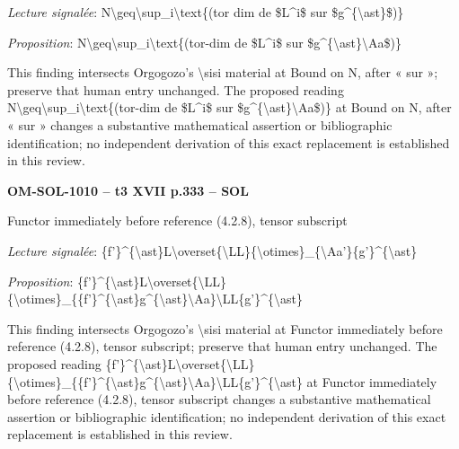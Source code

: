 \emph{Lecture signalée}: N\textbackslash{}geq\textbackslash{}sup\_i\textbackslash{}text\{(tor dim de \$L\textasciicircum{}i\$ sur \$g\textasciicircum{}\{\textbackslash{}ast\}\$)\}\par
\emph{Proposition}: N\textbackslash{}geq\textbackslash{}sup\_i\textbackslash{}text\{(tor-dim de \$L\textasciicircum{}i\$ sur \$g\textasciicircum{}\{\textbackslash{}ast\}\textbackslash{}Aa\$)\}\par
This finding intersects Orgogozo's \textbackslash{}sisi material at Bound on N, after « sur »; preserve that human entry unchanged. The proposed reading N\textbackslash{}geq\textbackslash{}sup\_i\textbackslash{}text\{(tor-dim de \$L\textasciicircum{}i\$ sur \$g\textasciicircum{}\{\textbackslash{}ast\}\textbackslash{}Aa\$)\} at Bound on N, after « sur » changes a substantive mathematical assertion or bibliographic identification; no independent derivation of this exact replacement is established in this review.\par
\par\noindent\textbf{OM-SOL-1010 -- t3 XVII p.333 -- SOL}\par
Functor immediately before reference (4.2.8), tensor subscript\par
\emph{Lecture signalée}: \{f'\}\textasciicircum{}\{\textbackslash{}ast\}L\textbackslash{}overset\{\textbackslash{}LL\}\{\textbackslash{}otimes\}\_\{\textbackslash{}Aa'\}\{g'\}\textasciicircum{}\{\textbackslash{}ast\}\par
\emph{Proposition}: \{f'\}\textasciicircum{}\{\textbackslash{}ast\}L\textbackslash{}overset\{\textbackslash{}LL\}\{\textbackslash{}otimes\}\_\{\{f'\}\textasciicircum{}\{\textbackslash{}ast\}g\textasciicircum{}\{\textbackslash{}ast\}\textbackslash{}Aa\}\textbackslash{}LL\{g'\}\textasciicircum{}\{\textbackslash{}ast\}\par
This finding intersects Orgogozo's \textbackslash{}sisi material at Functor immediately before reference (4.2.8), tensor subscript; preserve that human entry unchanged. The proposed reading \{f'\}\textasciicircum{}\{\textbackslash{}ast\}L\textbackslash{}overset\{\textbackslash{}LL\}\{\textbackslash{}otimes\}\_\{\{f'\}\textasciicircum{}\{\textbackslash{}ast\}g\textasciicircum{}\{\textbackslash{}ast\}\textbackslash{}Aa\}\textbackslash{}LL\{g'\}\textasciicircum{}\{\textbackslash{}ast\} at Functor immediately before reference (4.2.8), tensor subscript changes a substantive mathematical assertion or bibliographic identification; no independent derivation of this exact replacement is established in this review.\par
